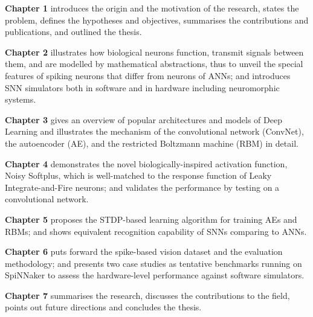 \textbf{Chapter 1} introduces the origin and the motivation of the research, states the problem, defines the hypotheses and objectives, summarises the contributions and publications, and outlined the thesis. 

\textbf{Chapter 2} %
illustrates how biological neurons function, transmit signals between them, and are modelled by mathematical abstractions, thus to unveil the special features of spiking neurons that differ from neurons of ANNs; and introduces SNN simulators both in software and in hardware including neuromorphic systems.

\textbf{Chapter 3} gives an overview of popular architectures and models of Deep Learning and illustrates the mechanism of the convolutional network (ConvNet), the autoencoder (AE), and the restricted Boltzmann machine (RBM) in detail.

\textbf{Chapter 4} demonstrates the novel biologically-inspired activation function, Noisy Softplus, which is well-matched to the response function of Leaky Integrate-and-Fire neurons; and validates the performance by testing on a convolutional network.

\textbf{Chapter 5} proposes the STDP-based learning algorithm for training AEs and RBMs; and shows equivalent recognition capability of SNNs comparing to ANNs.

\textbf{Chapter 6} puts forward the spike-based vision dataset and the evaluation methodology; and presents two case studies as tentative benchmarks running on SpiNNaker to assess the hardware-level performance against software simulators.

\textbf{Chapter 7} summarises the research, discusses the contributions to the field, points out future directions and concludes the thesis.



